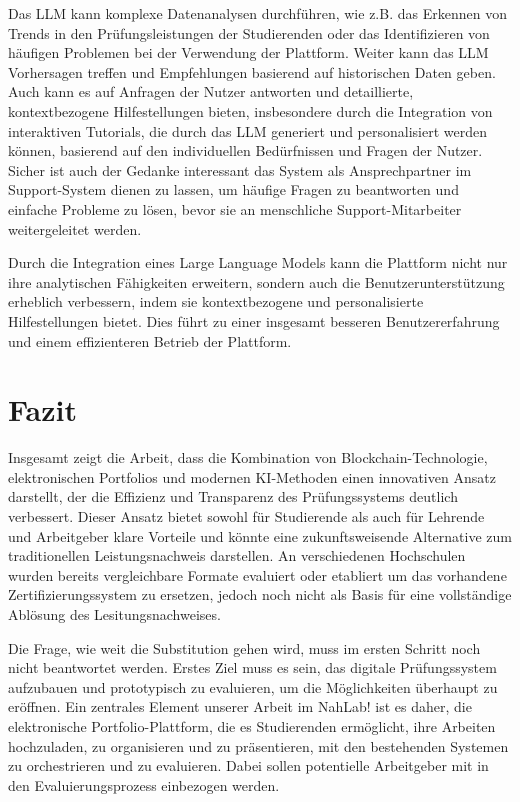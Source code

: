 \documentclass[conference]{IEEEtran}
\begin{document}
Das LLM kann komplexe Datenanalysen durchführen, wie z.B. das Erkennen von Trends in den Prüfungsleistungen der Studierenden oder das Identifizieren von häufigen Problemen bei der Verwendung der Plattform. Weiter kann das LLM  Vorhersagen treffen und Empfehlungen basierend auf historischen Daten geben.
Auch kann es auf Anfragen der Nutzer antworten und detaillierte, kontextbezogene Hilfestellungen bieten, insbesondere durch die  Integration von interaktiven Tutorials, die durch das LLM generiert und personalisiert werden können, basierend auf den individuellen Bedürfnissen und Fragen der Nutzer. \\
Sicher ist auch der Gedanke interessant das System als Ansprechpartner im Support-System dienen zu lassen, um häufige Fragen zu beantworten und einfache Probleme zu lösen, bevor sie an menschliche Support-Mitarbeiter weitergeleitet werden.

Durch die Integration eines Large Language Models kann die Plattform nicht nur ihre analytischen Fähigkeiten erweitern, sondern auch die Benutzerunterstützung erheblich verbessern, indem sie kontextbezogene und personalisierte Hilfestellungen bietet. Dies führt zu einer insgesamt besseren Benutzererfahrung und einem effizienteren Betrieb der Plattform.

\section{Fazit}
Insgesamt zeigt die Arbeit, dass die Kombination von Blockchain-Technologie, elektronischen Portfolios und modernen KI-Methoden einen innovativen Ansatz darstellt, der die Effizienz und Transparenz des Prüfungssystems deutlich verbessert. Dieser Ansatz bietet sowohl für Studierende als auch für Lehrende und Arbeitgeber klare Vorteile und könnte eine zukunftsweisende Alternative zum traditionellen Leistungsnachweis  darstellen. An verschiedenen Hochschulen wurden bereits vergleichbare Formate evaluiert oder etabliert um das vorhandene Zertifizierungssystem zu ersetzen, jedoch noch nicht als Basis für eine vollständige Ablösung des Lesitungsnachweises.

Die Frage, wie weit die Substitution gehen wird, muss im ersten Schritt noch nicht beantwortet werden. Erstes Ziel muss es sein, das digitale Prüfungssystem aufzubauen und prototypisch zu evaluieren, um die Möglichkeiten überhaupt zu eröffnen. Ein zentrales Element unserer Arbeit im NahLab! ist es daher, die elektronische Portfolio-Plattform, die es Studierenden ermöglicht, ihre Arbeiten hochzuladen, zu organisieren und zu präsentieren, mit den bestehenden Systemen zu orchestrieren und zu evaluieren. Dabei sollen potentielle Arbeitgeber mit in den Evaluierungsprozess einbezogen werden.
\end{document}
